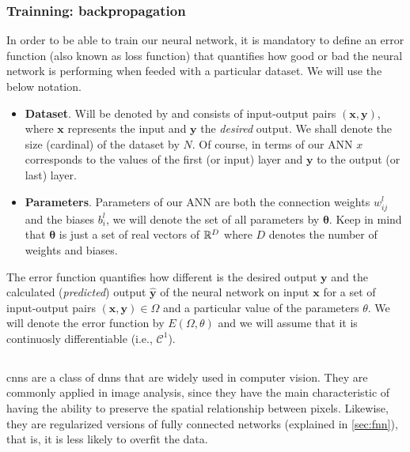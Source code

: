 \subsubsection{Trainning: backpropagation}%
\label{sec:backward}
In order to be able to train our neural network, it is mandatory to define an
error function (also known as loss function) that quantifies how good or bad
the neural network is performing when feeded with a particular dataset. We will
use the below notation.
\begin{itemize}
  \item \textbf{Dataset}. Will be denoted by and consists of input-output pairs
  \((\mathbf{x}, \mathbf{y})\), where \(\mathbf{x}\) represents the input and
  \(\mathbf{y}\) the \emph{desired} output. We shall denote the size (cardinal)
  of the dataset by \(N\). Of course, in terms of our ANN \(x\) corresponds to
  the values of the first (or input) layer and \(\mathbf{y}\) to the output (or
  last) layer.
  \item \textbf{Parameters}. Parameters of our ANN are both the connection
  weights \(w_{ij}^l\) and the biases \(b_i^l\), we will denote the set of all
  parameters by \(\bm{\theta}\). Keep in mind that \(\bm{\theta}\) is just a
  set of real vectors of \(\mathbb{R}^D\) where \(D\) denotes the number of weights and
  biases.
\end{itemize}

The error function quantifies how different is the desired output
\(\mathbf{y}\) and the calculated (\emph{predicted}) output
\(\mathbf{\hat{y}}\) of the neural network on input \(\mathbf{x}\) for a set of
input-output pairs \((\mathbf{x} , \mathbf{y}) \in \Omega\) and a particular
value of the parameters \(\theta\). We will denote the error function by
\(E (\Omega, \theta)\) and we will assume that it is continuosly differentiable
(i.e., \(\mathcal{C}^1\)).

\subsection{}\label{sec:conv-neur-netw}

\glspl{cnn} are a class of \glspl{dnn} that are widely used in computer
vision. They are commonly applied in image analysis, since they have the main
characteristic of having the ability to preserve the spatial relationship
between pixels. Likewise, they are regularized versions of fully connected
networks (explained in \vref{sec:fnn}), that is, it is less likely
to overfit the data.

